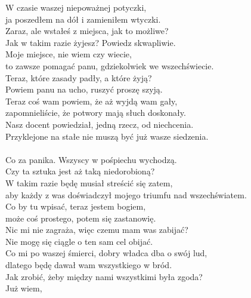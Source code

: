 \chardoc{}
W czasie waszej niepoważnej potyczki,\\
ja poszedłem na dół i zamieniłem wtyczki.\\

\charszam{}
Zaraz, ale wstałeś z miejsca, jak to możliwe?\\
Jak w takim razie żyjesz? Powiedz skwapliwie.\\

\chardoc{}
Moje miejsce, nie wiem czy wiecie,\\
to zawsze pomagać panu, gdziekolwiek we wszechświecie.\\
Teraz, które zasady padły, a które żyją?\\
Powiem panu na ucho, ruszyć proszę szyją.\\

\charfer{}
Teraz coś wam powiem, że aż wyjdą wam gały,\\
zapomnieliście, że potwory mają słuch doskonały.\\
Nasz docent powiedział, jedną rzecz, od niechcenia.\\
Przyklejone na stałe nie muszą być już wasze siedzenia.\\

\\

\charszam{}
Co za panika. Wszyscy w pośpiechu wychodzą.\\
Czy ta sztuka jest aż taką niedorobioną?\\
W takim razie będę musiał streścić się zatem,\\
aby każdy z was doświadczył mojego triumfu nad wszechświatem.\\
Co by tu wpisać, teraz jestem bogiem,\\
może coś prostego, potem się zastanowię.\\
Nic mi nie zagraża, więc czemu mam was zabijać?\\
Nie mogę się ciągle o ten sam cel obijać.\\
Co mi po waszej śmierci, dobry władca dba o swój lud,\\
dlatego będę dawał wam wszystkiego w bród.\\
Jak zrobić, żeby między nami wszystkimi była zgoda?\\
Już wiem, \\











